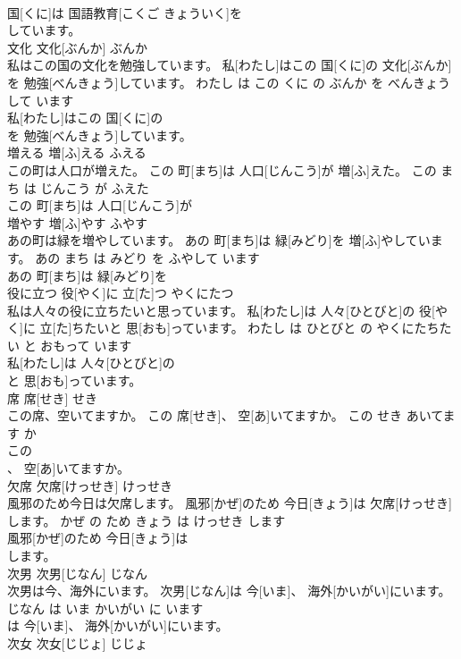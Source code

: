\documentclass[8pt]{extreport}
\begin{document}
\begin{CJK}{UTF8}{min}
\\	国[くに]は 国語教育[こくご きょういく]を
\\	しています。			
\\	文化	文化[ぶんか]	ぶんか	
\\	私はこの国の文化を勉強しています。	私[わたし]はこの 国[くに]の 文化[ぶんか]を 勉強[べんきょう]しています。	わたし は この くに の ぶんか を べんきょう して います	
\\	私[わたし]はこの 国[くに]の
\\	を 勉強[べんきょう]しています。			
\\	増える	増[ふ]える	ふえる	
\\	この町は人口が増えた。	この 町[まち]は 人口[じんこう]が 増[ふ]えた。	この まち は じんこう が ふえた	
\\	この 町[まち]は 人口[じんこう]が
\\	増やす	増[ふ]やす	ふやす	
\\	あの町は緑を増やしています。	あの 町[まち]は 緑[みどり]を 増[ふ]やしています。	あの まち は みどり を ふやして います	
\\	あの 町[まち]は 緑[みどり]を
\\	役に立つ	役[やく]に 立[た]つ	やくにたつ	
\\	私は人々の役に立ちたいと思っています。	私[わたし]は 人々[ひとびと]の 役[やく]に 立[た]ちたいと 思[おも]っています。	わたし は ひとびと の やくにたちたい と おもって います	
\\	私[わたし]は 人々[ひとびと]の
\\	と 思[おも]っています。			
\\	席	席[せき]	せき	
\\	この席、空いてますか。	この 席[せき]、 空[あ]いてますか。	この せき あいてます か	
\\	この
\\	、 空[あ]いてますか。			
\\	欠席	欠席[けっせき]	けっせき	
\\	風邪のため今日は欠席します。	風邪[かぜ]のため 今日[きょう]は 欠席[けっせき]します。	かぜ の ため きょう は けっせき します	
\\	風邪[かぜ]のため 今日[きょう]は
\\	します。			
\\	次男	次男[じなん]	じなん	
\\	次男は今、海外にいます。	次男[じなん]は 今[いま]、 海外[かいがい]にいます。	じなん は いま かいがい に います	
\\	は 今[いま]、 海外[かいがい]にいます。			
\\	次女	次女[じじょ]	じじょ	

\end{CJK}
\end{document}
